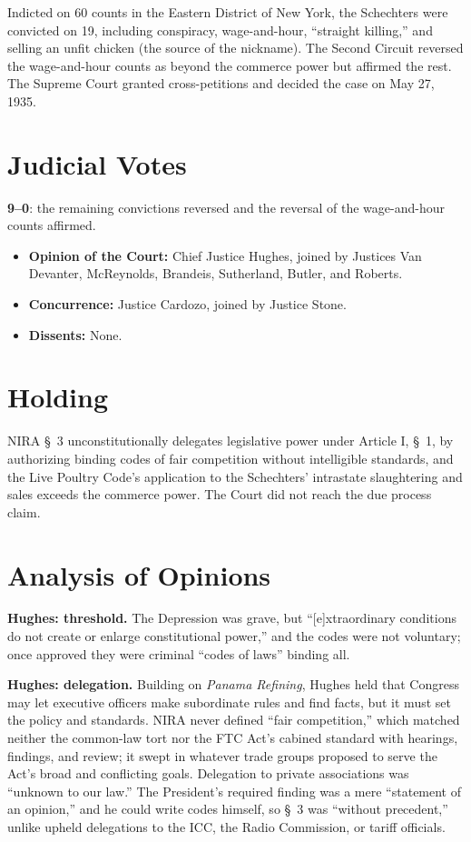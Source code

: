 \documentclass[12pt]{article}
\begin{document}
Indicted on 60 counts in the Eastern District of New York, the Schechters were convicted on 19, including conspiracy, wage-and-hour, ``straight killing,'' and selling an unfit chicken (the source of the nickname). The Second Circuit reversed the wage-and-hour counts as beyond the commerce power but affirmed the rest. The Supreme Court granted cross-petitions and decided the case on May 27, 1935.

\section{Judicial Votes}

\textbf{9--0}: the remaining convictions reversed and the reversal of the wage-and-hour counts affirmed.
\begin{itemize}
\item \textbf{Opinion of the Court:} Chief Justice Hughes, joined by Justices Van Devanter, McReynolds, Brandeis, Sutherland, Butler, and Roberts.
\item \textbf{Concurrence:} Justice Cardozo, joined by Justice Stone.
\item \textbf{Dissents:} None.
\end{itemize}

\section{Holding}

NIRA \S~3 unconstitutionally delegates legislative power under Article I, \S~1, by authorizing binding codes of fair competition without intelligible standards, and the Live Poultry Code's application to the Schechters' intrastate slaughtering and sales exceeds the commerce power. The Court did not reach the due process claim.

\section{Analysis of Opinions}

\textbf{Hughes: threshold.} The Depression was grave, but ``[e]xtraordinary conditions do not create or enlarge constitutional power,'' and the codes were not voluntary; once approved they were criminal ``codes of laws'' binding all.

\textbf{Hughes: delegation.} Building on \textit{Panama Refining}, Hughes held that Congress may let executive officers make subordinate rules and find facts, but it must set the policy and standards. NIRA never defined ``fair competition,'' which matched neither the common-law tort nor the FTC Act's cabined standard with hearings, findings, and review; it swept in whatever trade groups proposed to serve the Act's broad and conflicting goals. Delegation to private associations was ``unknown to our law.'' The President's required finding was a mere ``statement of an opinion,'' and he could write codes himself, so \S~3 was ``without precedent,'' unlike upheld delegations to the ICC, the Radio Commission, or tariff officials.
\end{document}
